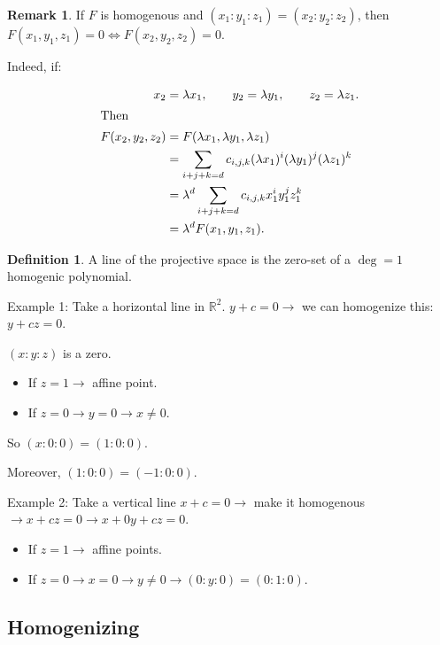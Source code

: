 \documentclass[11pt]{article}
\theoremstyle{definition}
\newtheorem{definition}{Definition}[section]
\newtheorem{remark}{Remark}[section]
\theoremstyle{proof}
\begin{document}
\begin{remark}
	If $F$ is homogenous and $(x_1:y_1:z_1) = (x_2:y_2:z_2)$, then $F(x_1,y_1,z_1) = 0 \iff F(x_2, y_2, z_2) = 0$.
	
	Indeed, if:
	
	\begin{align}
		x_2 &= \lambda x_1, \qquad
		y_2 = \lambda y_1, \qquad
		z_2 = \lambda z_1. \\
		\intertext{Then}
		F(x_2,y_2,z_2)
		&= F(\lambda x_1,\lambda y_1,\lambda z_1) \\
		&= \sum_{i+j+k=d} c_{i,j,k} (\lambda x_1)^i (\lambda y_1)^j (\lambda z_1)^k \\
		&= \lambda^d \sum_{i+j+k=d} c_{i,j,k} x_1^i y_1^j z_1^k \\
		&= \lambda^d F(x_1,y_1,z_1).
	\end{align}
\end{remark}

\begin{definition}
	A line of the projective space is the zero-set of a $\deg = 1$ homogenic polynomial.
	
	Example 1: Take a horizontal line in $\mathbb{R}^2$. $y + c = 0 \rightarrow$ we can homogenize this: $y + cz = 0$.
	
	$(x:y:z)$ is a zero.
	
	\begin{itemize}
		\item If $z = 1 \rightarrow$ affine point.
		\item If $z = 0 \rightarrow y = 0 \rightarrow x \ne 0$.
	\end{itemize}
	
	So $(x:0:0) = (1:0:0)$.
	
	Moreover, $(1:0:0) = (-1:0:0)$.
	
	Example 2: Take a vertical line $x + c = 0 \rightarrow$ make it homogenous $\rightarrow x + cz = 0 \rightarrow x + 0y + cz = 0$.
	
	\begin{itemize}
		\item If $z = 1 \rightarrow$ affine points.
		\item If $z = 0 \rightarrow x = 0 \rightarrow y \ne 0 \rightarrow (0:y:0) = (0:1:0)$.
	\end{itemize}
\end{definition}

\subsection{Homogenizing}
\end{document}
